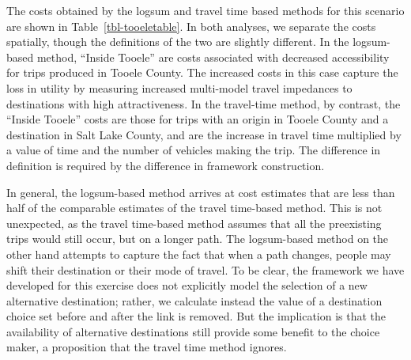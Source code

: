 \documentclass[]{ascelike-new}
\begin{document}
The costs obtained by the logsum and travel time based methods for this
scenario are shown in Table~\ref{tbl-tooeletable}. In both analyses, we
separate the costs spatially, though the definitions of the two are
slightly different. In the logsum-based method, ``Inside Tooele'' are
costs associated with decreased accessibility for trips produced in
Tooele County. The increased costs in this case capture the loss in
utility by measuring increased multi-model travel impedances to
destinations with high attractiveness. In the travel-time method, by
contrast, the ``Inside Tooele'' costs are those for trips with an origin
in Tooele County and a destination in Salt Lake County, and are the
increase in travel time multiplied by a value of time and the number of
vehicles making the trip. The difference in definition is required by
the difference in framework construction.

In general, the logsum-based method arrives at cost estimates that are
less than half of the comparable estimates of the travel time-based
method. This is not unexpected, as the travel time-based method assumes
that all the preexisting trips would still occur, but on a longer path.
The logsum-based method on the other hand attempts to capture the fact
that when a path changes, people may shift their destination or their
mode of travel. To be clear, the framework we have developed for this
exercise does not explicitly model the selection of a new alternative
destination; rather, we calculate instead the value of a destination
choice set before and after the link is removed. But the implication is
that the availability of alternative destinations still provide some
benefit to the choice maker, a proposition that the travel time method
ignores.
\end{document}
